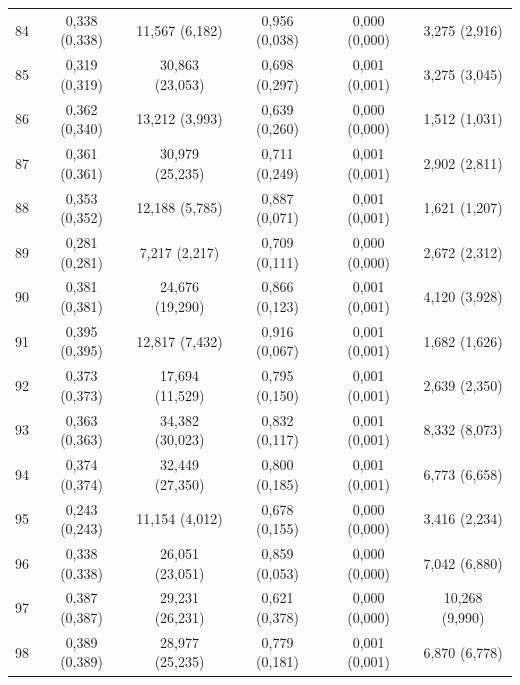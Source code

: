 \begin{tabular}{l c c c c c}
84 & 0,338 (0,338) & 11,567 (6,182) & 0,956 (0,038) & 0,000 (0,000) & 3,275 (2,916) \\
85 & 0,319 (0,319) & 30,863 (23,053) & 0,698 (0,297) & 0,001 (0,001) & 3,275 (3,045) \\
86 & 0,362 (0,340) & 13,212 (3,993) & 0,639 (0,260) & 0,000 (0,000) & 1,512 (1,031) \\
87 & 0,361 (0,361) & 30,979 (25,235) & 0,711 (0,249) & 0,001 (0,001) & 2,902 (2,811) \\
88 & 0,353 (0,352) & 12,188 (5,785) & 0,887 (0,071) & 0,001 (0,001) & 1,621 (1,207) \\
89 & 0,281 (0,281) & 7,217 (2,217) & 0,709 (0,111) & 0,000 (0,000) & 2,672 (2,312) \\
90 & 0,381 (0,381) & 24,676 (19,290) & 0,866 (0,123) & 0,001 (0,001) & 4,120 (3,928) \\
91 & 0,395 (0,395) & 12,817 (7,432) & 0,916 (0,067) & 0,001 (0,001) & 1,682 (1,626) \\
92 & 0,373 (0,373) & 17,694 (11,529) & 0,795 (0,150) & 0,001 (0,001) & 2,639 (2,350) \\
93 & 0,363 (0,363) & 34,382 (30,023) & 0,832 (0,117) & 0,001 (0,001) & 8,332 (8,073) \\
94 & 0,374 (0,374) & 32,449 (27,350) & 0,800 (0,185) & 0,001 (0,001) & 6,773 (6,658) \\
95 & 0,243 (0,243) & 11,154 (4,012) & 0,678 (0,155) & 0,000 (0,000) & 3,416 (2,234) \\
96 & 0,338 (0,338) & 26,051 (23,051) & 0,859 (0,053) & 0,000 (0,000) & 7,042 (6,880) \\
97 & 0,387 (0,387) & 29,231 (26,231) & 0,621 (0,378) & 0,000 (0,000) & 10,268 (9,990) \\
98 & 0,389 (0,389) & 28,977 (25,235) & 0,779 (0,181) & 0,001 (0,001) & 6,870 (6,778) \\
\hline 
 \end{tabular}

